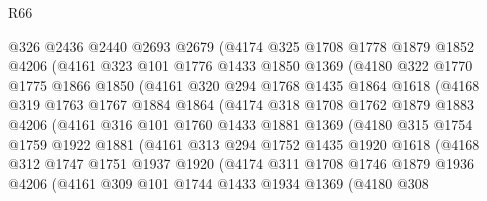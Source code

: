 \begin{lexlean}{R66}
\begin{coremodule}
            @326
            @2436
            @2440
            @2693
            @2679
            (@4174
              @325
              @1708
              @1778
              @1879
              @1852
              @4206
              (@4161
                @323
                @101
                @1776
                @1433
                @1850
                @1369
                (@4180
                  @322
                  @1770
                  @1775
                  @1866
                  @1850
                  (@4161
                    @320
                    @294
                    @1768
                    @1435
                    @1864
                    @1618
                    (@4168
                      @319
                      @1763
                      @1767
                      @1884
                      @1864
                      (@4174
                        @318
                        @1708
                        @1762
                        @1879
                        @1883
                        @4206
                        (@4161
                          @316
                          @101
                          @1760
                          @1433
                          @1881
                          @1369
                          (@4180
                            @315
                            @1754
                            @1759
                            @1922
                            @1881
                            (@4161
                              @313
                              @294
                              @1752
                              @1435
                              @1920
                              @1618
                              (@4168
                                @312
                                @1747
                                @1751
                                @1937
                                @1920
                                (@4174
                                  @311
                                  @1708
                                  @1746
                                  @1879
                                  @1936
                                  @4206
                                  (@4161
                                    @309
                                    @101
                                    @1744
                                    @1433
                                    @1934
                                    @1369
                                    (@4180
                                      @308

\end{coremodule}
\end{lexlean}
